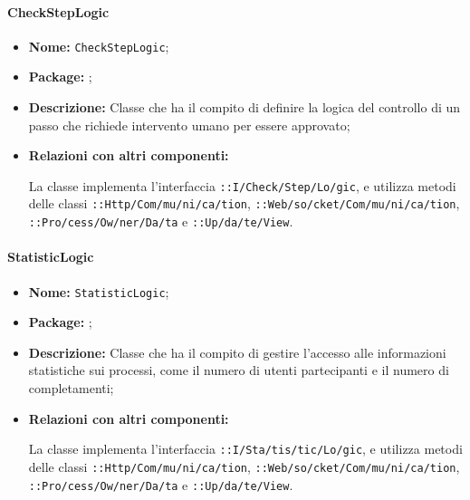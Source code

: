 \paragraph{CheckStepLogic}
\begin{flushleft}
\begin{itemize}
\item \textbf{Nome:} \texttt{CheckStepLogic};
\item \textbf{Package:} \texttt{\logicAdmin{}};
\item \textbf{Descrizione:} Classe che ha il compito di definire la logica del controllo di un passo che richiede intervento umano per essere approvato;
\item \textbf{Relazioni con altri componenti:}
\begin{sloppypar}
La classe implementa l'interfaccia \texttt{\iLogicAdmin{}::I\fshyp{}Check\fshyp{}Step\fshyp{}Lo\fshyp{}gic}, e utilizza metodi delle classi \texttt{\serverCommunication{}::Http\fshyp{}Com\fshyp{}mu\fshyp{}ni\fshyp{}ca\fshyp{}tion}, \texttt{\serverCommunication{}::Web\fshyp{}so\fshyp{}cket\fshyp{}Com\fshyp{}mu\fshyp{}ni\fshyp{}ca\fshyp{}tion}, \texttt{\modelAdmin{}::Pro\fshyp{}cess\fshyp{}Ow\fshyp{}ner\fshyp{}Da\fshyp{}ta} e \texttt{\viewAdmin{}::Up\fshyp{}da\fshyp{}te\fshyp{}View}.
\end{sloppypar}
\end{itemize}
\end{flushleft}

\paragraph{StatisticLogic}
\begin{flushleft}
\begin{itemize}
\item \textbf{Nome:} \texttt{StatisticLogic};
\item \textbf{Package:} \texttt{\logicAdmin{}};
\item \textbf{Descrizione:} Classe che ha il compito di gestire l'accesso alle informazioni statistiche sui processi, come il numero di utenti partecipanti e il numero di completamenti;
\item \textbf{Relazioni con altri componenti:}
\begin{sloppypar}
La classe implementa l'interfaccia \texttt{\iLogicAdmin{}::I\fshyp{}Sta\fshyp{}tis\fshyp{}tic\fshyp{}Lo\fshyp{}gic}, e utilizza metodi delle classi \texttt{\serverCommunication{}::Http\fshyp{}Com\fshyp{}mu\fshyp{}ni\fshyp{}ca\fshyp{}tion}, \texttt{\serverCommunication{}::Web\fshyp{}so\fshyp{}cket\fshyp{}Com\fshyp{}mu\fshyp{}ni\fshyp{}ca\fshyp{}tion}, \texttt{\modelAdmin{}::Pro\fshyp{}cess\fshyp{}Ow\fshyp{}ner\fshyp{}Da\fshyp{}ta} e \texttt{\viewAdmin{}::Up\fshyp{}da\fshyp{}te\fshyp{}View}.
\end{sloppypar}
\end{itemize}
\end{flushleft}

